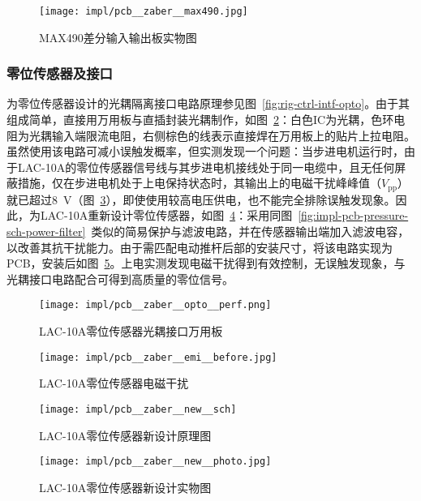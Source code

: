 \begin{figure}[tbh]
\centering
\texttt{[image: impl/pcb\_\_zaber\_\_max490.jpg]}
\caption{MAX490差分输入输出板实物图}
\label{fig:impl-pcb-zaber-max490}
\end{figure}

\subsubsection{零位传感器及接口}\label{sec:impl-pcb-zaber-homing}

为零位传感器设计的光耦隔离接口电路原理参见图~\ref{fig:rig-ctrl-intf-opto}。由于其组成简单，直接用万用板与直插封装光耦制作，如图~\ref{fig:impl-pcb-zaber-opto-perf}：白色IC为光耦，色环电阻为光耦输入端限流电阻，右侧棕色的线表示直接焊在万用板上的贴片上拉电阻。虽然使用该电路可减小误触发概率，但实测发现一个问题：当步进电机运行时，由于LAC-10A的零位传感器信号线与其步进电机接线处于同一电缆中，且无任何屏蔽措施，仅在步进电机处于上电保持状态时，其输出上的电磁干扰峰峰值（$V_{\mathrm{pp}}$）就已超过\SI{8}{\V}（图~\ref{fig:impl-pcb-zaber-emi-before}），即使使用较高电压供电，也不能完全排除误触发现象。因此，为LAC-10A重新设计零位传感器，如图~\ref{fig:impl-pcb-zaber-new-sch}：采用同图~\ref{fig:impl-pcb-pressure-sch-power-filter}~类似的简易保护与滤波电路，并在传感器输出端加入滤波电容，以改善其抗干扰能力。由于需匹配电动推杆后部的安装尺寸，将该电路实现为PCB，安装后如图~\ref{fig:impl-pcb-zaber-new-photo}。上电实测发现电磁干扰得到有效控制，无误触发现象，与光耦接口电路配合可得到高质量的零位信号。

\begin{figure}[tbhp]
\centering
\texttt{[image: impl/pcb\_\_zaber\_\_opto\_\_perf.png]}
\caption{LAC-10A零位传感器\csep 光耦接口\csep 万用板}
\label{fig:impl-pcb-zaber-opto-perf}
\end{figure}

\begin{figure}[tbhp]
\centering
\texttt{[image: impl/pcb\_\_zaber\_\_emi\_\_before.jpg]}
\caption{LAC-10A零位传感器\csep 电磁干扰}
\label{fig:impl-pcb-zaber-emi-before}
\end{figure}

\begin{figure}[p]
\centering
\texttt{[image: impl/pcb\_\_zaber\_\_new\_\_sch]}
\caption{LAC-10A零位传感器\csep 新设计\csep 原理图}
\label{fig:impl-pcb-zaber-new-sch}
\end{figure}

\begin{figure}[p]
\centering
\texttt{[image: impl/pcb\_\_zaber\_\_new\_\_photo.jpg]}
\caption{LAC-10A零位传感器\csep 新设计\csep 实物图}
\label{fig:impl-pcb-zaber-new-photo}
\end{figure}


